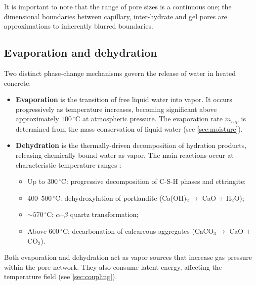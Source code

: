 It is important to note that the range of pore sizes is a continuous one; the dimensional boundaries between capillary, inter-hydrate and gel pores are approximations to inherently blurred boundaries.

\subsection{Evaporation and dehydration} \label{sec:evap_dehyd}

Two distinct phase-change mechanisms govern the release of water in heated concrete:
\begin{itemize}
    \item \textbf{Evaporation} is the transition of free liquid water into vapor. It occurs progressively as temperature increases, becoming significant above approximately $100\,^\circ$C at atmospheric pressure. The evaporation rate $\dot{m}_{vap}$ is  determined from the mass conservation of liquid water (see \cref{sec:moisture}).
    
    \item \textbf{Dehydration} is the thermally-driven decomposition of hydration products, releasing chemically bound water as vapor. The main reactions occur at characteristic temperature ranges \cite{dauti2018}:
    \begin{itemize}
        \item Up to $300\,^\circ$C: progressive decomposition of C-S-H phases and ettringite;
        \item $400$--$500\,^\circ$C: dehydroxylation of portlandite (Ca(OH)$_2 \rightarrow$ CaO $+$ H$_2$O);
        \item $\sim 570\,^\circ$C: $\alpha$--$\beta$ quartz transformation;
        \item Above $600\,^\circ$C: decarbonation of calcareous aggregates (CaCO$_3 \rightarrow$ CaO $+$ CO$_2$).
    \end{itemize}
\end{itemize}

Both evaporation and dehydration act as vapor sources that increase gas pressure within the pore network. They also consume latent energy, affecting the temperature field (see \cref{sec:coupling}).

